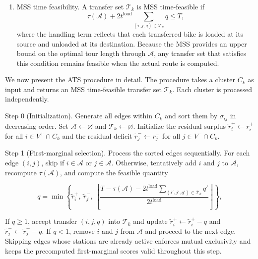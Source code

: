 \begin{enumerate}[label=(\arabic*)]
\begin{equation}
\end{equation}
is the maximum spanning star and the second term accounts for the depot round trip. This is the same estimate used in the clustering model.
\item MSS time feasibility. A transfer set ${{\mathcal{T}}_{k}}$ is MSS time-feasible if
\begin{equation}
\tau (\mathcal{A})+2{{t}^{\text{load}}}\sum\limits_{(i,j,q)\in {{\mathcal{T}}_{k}}}{q}\le T,
\end{equation}
where the handling term reflects that each transferred bike is loaded at its source and unloaded at its destination. Because the MSS provides an upper bound on the optimal tour length through $\mathcal{A}$, any transfer set that satisfies this condition remains feasible when the actual route is computed.
\end{enumerate}

We now present the ATS procedure in detail. The procedure takes a cluster ${{C}_{k}}$ as input and returns an MSS time-feasible transfer set ${{\mathcal{T}}_{k}}$. Each cluster is processed independently.

Step 0 (Initialization). Generate all edges within ${{C}_{k}}$ and sort them by ${{\sigma }_{ij}}$ in decreasing order. Set $\mathcal{A}\leftarrow \varnothing $ and ${{\mathcal{T}}_{k}}\leftarrow \varnothing $. Initialize the residual surplus $\tilde{r}_{i}^{+}\leftarrow r_{i}^{+}$ for all $i\in {{V}^{+}}\cap {{C}_{k}}$ and the residual deficit $\tilde{r}_{j}^{-}\leftarrow r_{j}^{-}$ for all $j\in {{V}^{-}}\cap {{C}_{k}}$.

Step 1 (First-marginal selection). Process the sorted edges sequentially. For each edge $(i,j)$, skip if $i\in \mathcal{A}$ or $j\in \mathcal{A}$. Otherwise, tentatively add $i$ and $j$ to $\mathcal{A}$, recompute $\tau (\mathcal{A})$, and compute the feasible quantity

\begin{equation}
q=\min \left\{ \tilde{r}_{i}^{+},\ \tilde{r}_{j}^{-},\ \left\lfloor \frac{T-\tau (\mathcal{A})-2{{t}^{\text{load}}}\sum\limits_{({i}',{j}',{q}')\in {{\mathcal{T}}_{k}}}{{{q}'}}}{2{{t}^{\text{load}}}} \right\rfloor  \right\},
\end{equation}

If $q\ge 1$, accept transfer $(i,j,q)$ into ${{\mathcal{T}}_{k}}$ and update $\tilde{r}_{i}^{+}\leftarrow \tilde{r}_{i}^{+}-q$ and $\tilde{r}_{j}^{-}\leftarrow \tilde{r}_{j}^{-}-q$. If $q<1$, remove $i$ and $j$ from $\mathcal{A}$ and proceed to the next edge. Skipping edges whose stations are already active enforces mutual exclusivity and keeps the precomputed first-marginal scores valid throughout this step.


